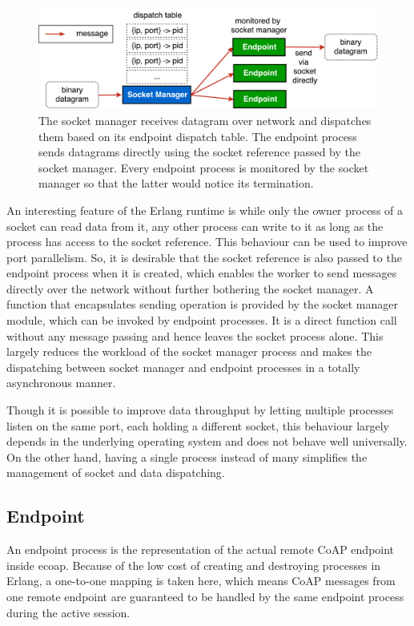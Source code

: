 \begin{figure}[!htbp]
\centering
\includegraphics[scale = 0.55]{coap_socket_manager}
\caption[The socket manager]{The socket manager receives datagram over network and dispatches them based on its endpoint dispatch table. The endpoint process sends datagrams directly using the socket reference passed by the socket manager. Every endpoint process is monitored by the socket manager so that the latter would notice its termination.}
\label{fig:coap_socket_manager}
\end{figure}

An interesting feature of the Erlang runtime is while only the owner process of a socket can read data from it, any other process can write to it as long as the process has access to the socket reference. This behaviour can be used to improve port parallelism. So, it is desirable that the socket reference is also passed to the endpoint process when it is created, which enables the worker to send messages directly over the network without further bothering the socket manager. A function that encapsulates sending operation is provided by the socket manager module, which can be invoked by endpoint processes. It is a direct function call without any message passing and hence leaves the socket process alone. This largely reduces the workload of the socket manager process and makes the dispatching between socket manager and endpoint processes in a totally asynchronous manner.

Though it is possible to improve data throughput by letting multiple processes listen on the same port, each holding a different socket, this behaviour largely depends in the underlying operating system and does not behave well universally. On the other hand, having a single process instead of many simplifies the management of socket and data dispatching.

\subsection{Endpoint}\label{coap_endpoint}

An endpoint process is the representation of the actual remote CoAP endpoint inside ecoap. Because of the low cost of creating and destroying processes in Erlang, a one-to-one mapping is taken here, which means CoAP messages from one remote endpoint are guaranteed to be handled by the same endpoint process during the active session.

